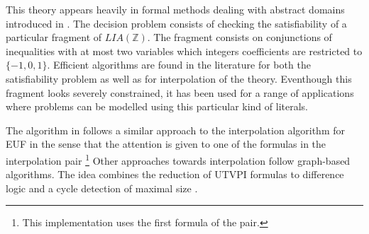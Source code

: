 This theory appears heavily in formal methods dealing
with abstract domains introduced in \cite{journals/corr/abs-cs-0703084}.
The decision problem consists of checking the satisfiability
of a particular fragment of $LIA(\mathbb{Z})$. The fragment 
consists on conjunctions of inequalities with at most
two variables which integers coefficients are restricted
to $\{-1, 0, 1\}$. Efficient algorithms are found in the literature
for both the satisfiability problem \cite{10.1007/11559306_9} as well as 
for interpolation \cite{10.1007/978-3-642-02959-2_15} of the theory. 
Eventhough this fragment looks severely constrained, 
it has been used for a range of applications where problems can 
be modelled using this particular kind of literals.

The algorithm in \cite{KAPUR2017} follows a similar approach to the
interpolation algorithm for EUF in the sense that the attention is
given to one of the formulas in the interpolation pair \footnote {
This implementation uses the first formula of the pair. }
Other approaches towards interpolation follow graph-based algorithms.
The idea combines the reduction of UTVPI formulas to difference 
logic \cite{journals/corr/abs-cs-0703084} and a cycle 
detection of maximal size \cite{10.1007/978-3-642-02959-2_15}.

